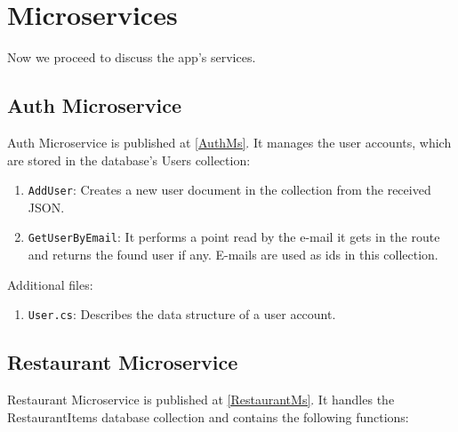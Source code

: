 \section{Microservices}
Now we proceed to discuss the app's services.
\subsection{Auth Microservice}\label{RestaurantMicroservice}

Auth Microservice is published at \ref{AuthMs}. It manages the user accounts, which are stored in the database's Users collection:

\begin{enumerate}
	\item \verb+AddUser+: Creates a new user document in the collection from the received JSON. 
	
	\item \verb+GetUserByEmail+: It performs a point read by the e-mail it gets in the route and returns the found user if any. E-mails are used as ids in this collection.
	
\end{enumerate}
Additional files:
\begin{enumerate}
	\item \verb+User.cs+: Describes the data structure of a user account.
\end{enumerate}

\subsection{Restaurant Microservice}\label{RestaurantMicroservice}
Restaurant Microservice is published at \ref{RestaurantMs}. It handles the RestaurantItems database collection and contains the following functions:

